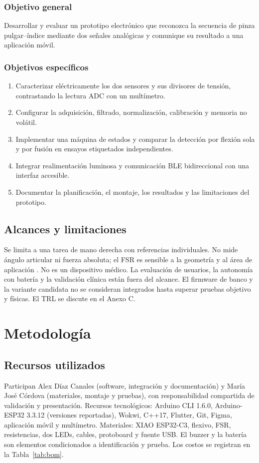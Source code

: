 \documentclass[11pt,letterpaper]{article}
\begin{document}
\subsubsection{Objetivo general}
Desarrollar y evaluar un prototipo electrónico que reconozca la secuencia de pinza pulgar--índice mediante dos señales analógicas y comunique su resultado a una aplicación móvil.
\subsubsection{Objetivos específicos}
\begin{enumerate}
\item Caracterizar eléctricamente los dos sensores y sus divisores de tensión, contrastando la lectura ADC con un multímetro.
\item Configurar la adquisición, filtrado, normalización, calibración y memoria no volátil.
\item Implementar una máquina de estados y comparar la detección por flexión sola y por fusión en ensayos etiquetados independientes.
\item Integrar realimentación luminosa y comunicación BLE bidireccional con una interfaz accesible.
\item Documentar la planificación, el montaje, los resultados y las limitaciones del prototipo.
\end{enumerate}
\subsection{Alcances y limitaciones}
Se limita a una tarea de mano derecha con referencias individuales. No mide ángulo articular ni fuerza absoluta; el FSR es sensible a la geometría y al área de aplicación \cite{fsr}. No es un dispositivo médico. La evaluación de usuarios, la autonomía con batería y la validación clínica están fuera del alcance. El firmware de banco y la variante candidata no se consideran integrados hasta superar pruebas objetivo y físicas. El TRL se discute en el Anexo C.
\section{Metodología}
\subsection{Recursos utilizados}
Participan Alex Díaz Canales (software, integración y documentación) y María José Córdova (materiales, montaje y pruebas), con responsabilidad compartida de validación y presentación. Recursos tecnológicos: Arduino CLI 1.6.0, Arduino-ESP32 3.3.12 (versiones reportadas), Wokwi, C++17, Flutter, Git, Figma, aplicación móvil y multímetro. Materiales: XIAO ESP32-C3, flexivo, FSR, resistencias, dos LEDs, cables, protoboard y fuente USB. El buzzer y la batería son elementos condicionados a identificación y prueba. Los costos se registran en la Tabla~\ref{tab:bom}.
\end{document}

